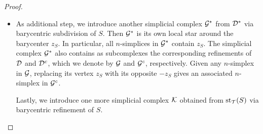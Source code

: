 \documentclass[10pt,a4paper]{article}
\begin{document}
\begin{proof}
\begin{itemize}
        \item 
        As additional step, we introduce another simplicial complex ${\mathcal G}^\ast$ from ${\mathcal D}^\ast$ via barycentric subdivision of $S$.
        Then ${\mathcal G}^\ast$ is its own local star around the barycenter $z_S$.
        In particular, all $n$-simplices in ${\mathcal G}^\ast$ contain $z_{S}$. 
        The simplicial complex ${\mathcal G}^\ast$ also contains as subcomplexes the corresponding refinements of ${\mathcal D}$ and ${\mathcal D}^{c}$, 
        which we denote by ${\mathcal G}$ and ${\mathcal G}^{c}$, respectively.
        Given any $n$-simplex in ${\mathcal G}$, replacing its vertex $z_{S}$ with its opposite $-z_{S}$ gives an associated $n$-simplex in ${\mathcal G}^{c}$.
        
        Lastly, we introduce one more simplicial complex ${\mathcal K}$ obtained from $\operatorname{st}_{{\mathcal T}}(S)$ via barycentric refinement of $S$. 
        

\end{itemize}
\end{proof}
\end{document}
